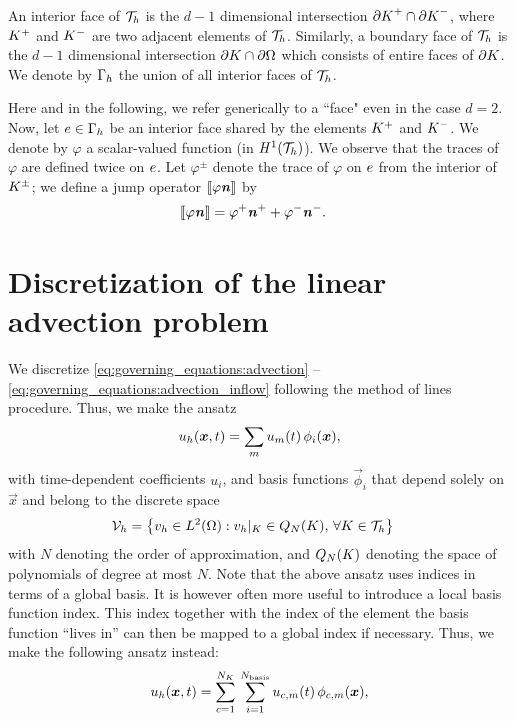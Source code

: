 \documentclass{scrreprt}
\begin{document}
An interior face of $\mathcal{T}_h$ is the $d-1$ dimensional intersection
${\partial K}^{+} \cap {\partial K}^{-}$, where ${K^+}$ and ${K^-}$
are two adjacent elements of $\mathcal{T}_h$. Similarly, a boundary face of $\mathcal{T}_h$ is
the $d-1$ dimensional intersection ${\partial K} \cap {\partial\Omega}$ which consists
of entire faces of ${\partial K}$.
We denote by $\Gamma_h$ the union of all interior faces of $\mathcal{T}_h$.

Here and in the following, we refer generically to a ``face" even in the
case $d=2$.
Now, let $e \in \Gamma_h$ be an interior face shared by
the elements ${K^+}$ and ${K^-}$.
We denote by $\varphi$ a scalar-valued function (in
$\mathit{H}^{1}(\mathcal{T}_h)$).
We observe that the traces of $\varphi$
are defined twice on $e$.
Let $\varphi^{\pm}$ denote the trace of $\varphi$ on $e$ from the
interior of $K^{\pm}$;
we define a jump operator $\llbracket{\varphi{\boldsymbol {\mathit{n}}}}\rrbracket$ by
\begin{align}
\llbracket{\varphi{\boldsymbol {\mathit{n}}}}\rrbracket &= \varphi^{+}{\boldsymbol {\mathit{n}}}^{+} + \varphi^{-}{\boldsymbol {\mathit{n}}}^{-}.
\end{align}
\section{Discretization of the linear advection problem}
We discretize \eqref{eq:governing_equations:advection} -- \eqref{eq:governing_equations:advection_inflow}
following the method of lines procedure. Thus, we make the ansatz
\begin{align}
u_h ({\boldsymbol x},t) = \sum_m u_m (t)\,\phi_i({\boldsymbol x}),
\end{align}
with time-dependent coefficients $u_i$, and basis
functions $\vec{\phi}_i$ that depend solely on $\vec{x}$ and belong
to the discrete space
\begin{align}
\mathcal{V}_h &= \left \{
v_h \in {L^2 (\Omega)}: v_h|_K \in
{Q}_N(K),\, \forall K \in \mathcal{T}_h
\right \}
\end{align}
with $N$ denoting the order of approximation, and
${Q}_N(K)$ denoting the space of polynomials of
degree at most $N$.
Note that the above ansatz uses indices in terms of a global basis.
It is however often more useful to introduce a local
basis function index. This index together with the index of the element the basis function
``lives in'' can then be mapped to a global index if necessary.
Thus, we make the following ansatz instead:
\begin{align}
u_h ({\boldsymbol x},t) =
\sum_{c=1}^{{N_{K}}}\,\sum_{i=1}^{N_{\textup{basis}}} u_{c,m}
(t)\,\phi_{c,m}({\boldsymbol x}),
\end{align}
\end{document}
